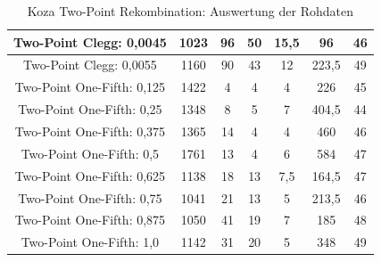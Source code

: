 \begin{table}[H]
\begin{tabular}{c | c | c | c | c | c | c}
		\hline
		Two-Point Clegg: 0,0045 & 1023 & 96 & 50 & 15,5 & 96 & 46\\
		\hline
		Two-Point Clegg: 0,0055 & 1160 & 90 & 43 & 12 & 223,5 & 49\\
		\hline
		Two-Point One-Fifth: 0,125 & 1422 & 4 & 4 & 4 & 226 & 45\\
		\hline
		Two-Point One-Fifth: 0,25 & 1348 & 8 & 5 & 7 & 404,5 & 44\\
		\hline
		Two-Point One-Fifth: 0,375 & 1365 & 14 & 4 & 4 & 460 & 46\\
		\hline
		Two-Point One-Fifth: 0,5 & 1761 & 13 & 4 & 6 & 584 & 47\\
		\hline
		Two-Point One-Fifth: 0,625 & 1138 & 18 & 13 & 7,5 & 164,5 & 47\\
		\hline
		Two-Point One-Fifth: 0,75 & 1041 & 21 & 13 & 5 & 213,5 & 46\\
		\hline
		Two-Point One-Fifth: 0,875 & 1050 & 41 & 19 & 7 & 185 & 48\\
		\hline
		Two-Point One-Fifth: 1,0 & 1142 & 31 & 20 & 5 & 348 & 49\\
	\end{tabular}
	\caption{Koza Two-Point Rekombination: Auswertung der Rohdaten}
	\label{table:kozaTwoPointRohdaten}
\end{table}

